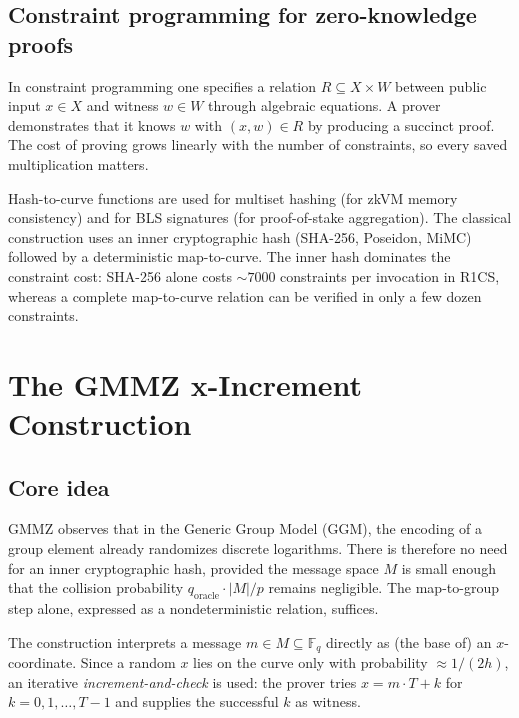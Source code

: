 \documentclass[11pt,a4paper]{article}
\theoremstyle{definition}
\newcommand{\F}{\mathbb{F}}
\begin{document}
\subsection{Constraint programming for zero-knowledge proofs}

In constraint programming one specifies a relation $R \subseteq X \times W$
between public input $x \in X$ and witness $w \in W$ through algebraic
equations. A prover demonstrates that it knows $w$ with $(x,w) \in R$ by
producing a succinct proof. The cost of proving grows linearly with the
number of constraints, so every saved multiplication matters.

Hash-to-curve functions are used for multiset hashing (for zkVM memory
consistency) and for BLS signatures (for proof-of-stake aggregation). The
classical construction uses an inner cryptographic hash (SHA-256, Poseidon,
MiMC) followed by a deterministic map-to-curve. The inner hash dominates
the constraint cost: SHA-256 alone costs $\sim 7000$ constraints per
invocation in R1CS, whereas a complete map-to-curve relation can be verified
in only a few dozen constraints.

\section{The GMMZ x-Increment Construction}
\label{sec:gmmz}

\subsection{Core idea}

GMMZ observes that in the Generic Group Model (GGM), the encoding of a group
element already randomizes discrete logarithms. There is therefore no need
for an inner cryptographic hash, provided the message space $M$ is small
enough that the collision probability $q_{\text{oracle}} \cdot |M| / p$
remains negligible. The map-to-group step alone, expressed as a
nondeterministic relation, suffices.

The construction interprets a message $m \in M \subseteq \F_q$ directly as
(the base of) an $x$-coordinate. Since a random $x$ lies on the curve only
with probability $\approx 1/(2h)$, an iterative \emph{increment-and-check}
is used: the prover tries $x = m \cdot T + k$ for $k = 0,1,\dots,T-1$ and
supplies the successful $k$ as witness.
\end{document}
